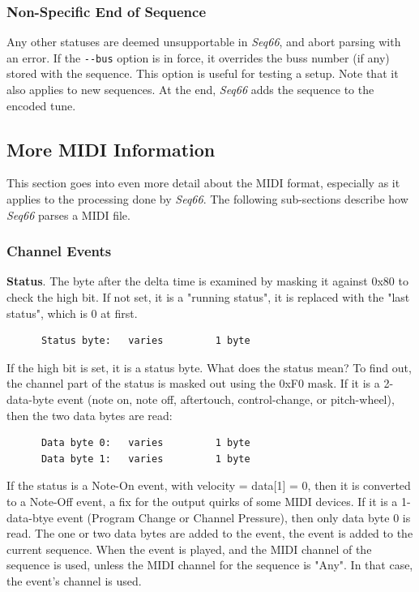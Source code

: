 \subsubsection{Non-Specific End of Sequence}
\label{subsubsec:midi_format_meta_sequence_ends}

   Any other statuses are deemed unsupportable in \textsl{Seq66}, and
   abort parsing with an error.
   If the \texttt{-{}-bus} option is in force, it overrides the buss number (if
   any) stored with the sequence.  This option is useful for testing a setup.
   Note that it also applies to new sequences.
   At the end, \textsl{Seq66} adds the sequence to the encoded tune.

\subsection{More MIDI Information}
\label{subsec:midi_information_more}

   This section goes into even more detail about the MIDI format, especially as
   it applies to the processing done by \textsl{Seq66}.
   The following sub-sections describe how \textsl{Seq66}
   parses a MIDI file.

\subsubsection{Channel Events}
\label{subsubsec:midi_format_channel_events}

   \textbf{Status}.
   The byte after the delta time is examined by masking it against 0x80 to check
   the high bit.  If not set, it is a "running status", it is replaced with the
   "last status", which is 0 at first.

   \begin{verbatim}
      Status byte:   varies         1 byte
   \end{verbatim}

   If the high bit is set, it is a status byte.  What does the status mean?  To
   find out, the channel part of the status is masked out using the 0xF0 mask.
   If it is a 2-data-byte event (note on, note off, aftertouch, control-change,
   or pitch-wheel), then the two data bytes are read:

   \begin{verbatim}
      Data byte 0:   varies         1 byte
      Data byte 1:   varies         1 byte
   \end{verbatim}

   If the status is a Note-On event, with velocity = data[1] = 0,
   then it is converted to a Note-Off event, a fix for the output quirks of
   some MIDI devices.
   If it is a 1-data-btye event (Program Change or Channel Pressure), then only
   data byte 0 is read.
   The one or two data bytes are added to the event,
   the event is added to the current sequence.
   When the event is played,
   and the MIDI channel of the sequence is used, unless
   the MIDI channel for the sequence is "Any".
   In that case, the event's channel is used.

